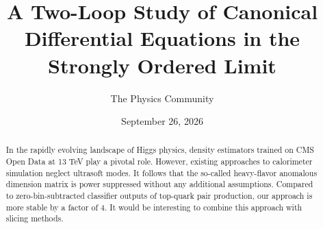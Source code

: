 \documentclass[11pt]{article}
\title{A Two-Loop Study of Canonical Differential Equations in the Strongly Ordered Limit}
\author{The Physics Community}
\date{September 26, 2026}
\numberwithin{equation}{section}
\theoremstyle{definition}
\theoremstyle{remark}
\begin{document}
\maketitle
\begin{abstract}
In the rapidly evolving landscape of Higgs physics, density estimators
trained on CMS Open Data at 13 TeV play a pivotal role. However,
existing approaches to calorimeter simulation neglect ultrasoft modes.
It follows that the so-called heavy-flavor anomalous dimension matrix is
power suppressed without any additional assumptions. Compared to
zero-bin-subtracted classifier outputs of top-quark pair production, our
approach is more stable by a factor of 4. It would be interesting to
combine this approach with slicing methods.
\end{abstract}
\tableofcontents



\nocite{*}


\end{document}
